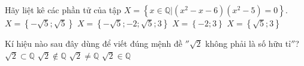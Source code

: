 \begin{ex}%
	Hãy liệt kê các phần tử của tập $X=\left\{ x\in \mathbb{Q}|\left( {x^2}-x-6 \right)\left( {x^2}-5 \right)=0 \right\}$.
	\choice
	{$X=\left\{ -\sqrt{5};\sqrt{5} \right\}$}
	{$X=\left\{ -\sqrt{5};-2;\sqrt{5};3 \right\}$}
	{\True $X=\left\{ -2;3 \right\}$}
	{$X=\left\{ \sqrt{5};3 \right\}$}
	\loigiai{		
		Ta có $\left( {x^2}-x-6 \right)\left( {x^2}-5 \right)=0\Leftrightarrow \left[ \begin{aligned}
			& {x^2}-x-6=0 \\
			& {x^2}-5=0 \\
		\end{aligned} \right.\Leftrightarrow \left[ \begin{aligned}
			& x=-2 \\
			& x=3 \\
			& x=\sqrt{5}\notin \mathbb{Q} \\
			& x=-\sqrt{5}\notin \mathbb{Q} \\
		\end{aligned} \right.$.\\
		Do vậy $X=\left\{ -2;3 \right\}$.}
\end{ex}
\begin{ex}%
	Kí hiệu nào sau đây dùng để viết đúng mệnh đề $''\sqrt{2}$ không phải là số hữu tỉ$''$?
	\choice
	{$\sqrt{2}\subset \mathbb{Q}$}
	{\True $\sqrt{2}\notin \mathbb{Q}$}
	{$\sqrt{2}\ne \mathbb{Q}$}
	{$\sqrt{2}\in \mathbb{Q}$}
\end{ex}
